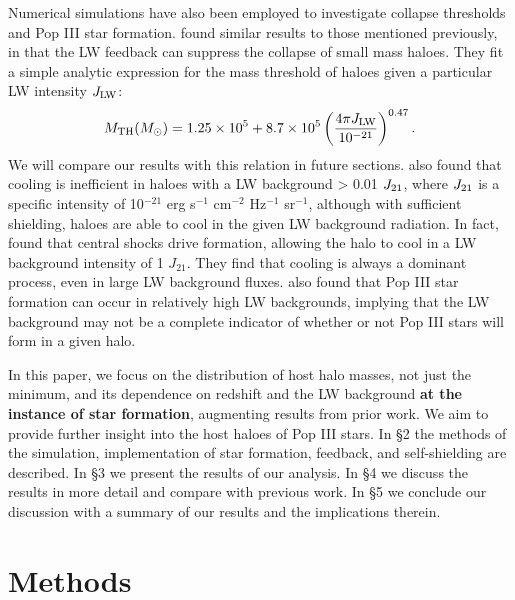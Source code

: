 \documentclass[fleqn,usenatbib]{mnras}
\begin{document}
Numerical simulations have also been employed to investigate collapse thresholds and Pop III star formation. \citet[hereafter M01]{Machacek01} found similar results to those mentioned previously, in that the LW feedback can suppress the collapse of small mass haloes. They fit a simple analytic expression for the mass threshold of haloes given a particular LW intensity $J_{\rm LW}$:
\begin{equation} \label{mthresh}
	M_{\rm TH} ( M_{\odot} ) = 1.25 \times 10^{5} + 8.7  \times 10^{5} \left( \frac{4 \pi J_{\rm LW}}{10^{-21}} \right)^{0.47} .
\end{equation}
We will compare our results with this relation in future sections. \citet{Yoshida03} also found that cooling is inefficient in haloes with a LW background > 0.01 $J_{\rm 21}$, where $J_{\rm 21}$ is a specific intensity of 10$^{-21}$ erg s$^{-1}$ cm$^{-2}$ Hz$^{-1}$ sr$^{-1}$, although with sufficient \hh{} shielding, haloes are able to cool in the given LW background radiation. In fact, \citet{Wise07_UVB} found that central shocks drive \hh{} formation, allowing the halo to cool in a LW background intensity of 1 $J_{21}$. They find that \hh{} cooling is always a dominant process, even in large LW background fluxes. \citet{OShea08} also found that Pop III star formation can occur in relatively high LW backgrounds, implying that the LW background may not be a complete indicator of whether or not Pop III stars will form in a given halo.    

In this paper, we focus on the distribution of host halo masses, not just the minimum, and its dependence on redshift and the LW background \textbf{at the instance of star formation}, augmenting results from prior work. We aim to provide further insight into the host haloes of Pop III stars. In \S 2 the methods of the simulation, implementation of star formation, feedback, and \hh{} self-shielding are described. In \S 3 we present the results of our analysis. In \S 4 we discuss the results in more detail and compare with previous work. In \S 5 we conclude our discussion with a summary of our results and the implications therein.

\section{Methods}
\end{document}
